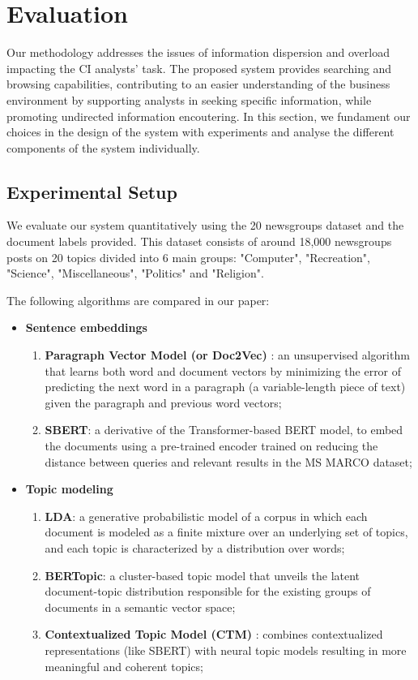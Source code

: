 \documentclass[a4paper]{article}
\begin{document}
\section{Evaluation}
Our methodology addresses the issues of information dispersion and overload impacting the CI analysts' task. The proposed system provides searching and browsing capabilities, contributing to an easier understanding of the business environment by supporting analysts in seeking specific information, while promoting undirected information encoutering. In this section, we fundament our choices in the design of the system with experiments and analyse the different components of the system individually.

\subsection{Experimental Setup}
We evaluate our system quantitatively using the 20 newsgroups \citep{pedregosa2011} dataset and the document labels provided. This dataset consists of around 18,000 newsgroups posts on 20 topics divided into 6 main groups: "Computer", "Recreation", "Science", "Miscellaneous", "Politics" and "Religion".

The following algorithms are compared in our paper:
\begin{itemize}
  \item \textbf{Sentence embeddings}
    \begin{enumerate}
      \item \textbf{Paragraph Vector Model (or Doc2Vec)} \citep{le2014}: an unsupervised algorithm that learns both word and document vectors by minimizing the error of predicting the next word in a paragraph (a variable-length piece of text) given the paragraph and previous word vectors;
      \item \textbf{SBERT}: a derivative of the Transformer-based BERT model, to embed the documents using a pre-trained encoder trained on reducing the distance between queries and relevant results in the MS MARCO dataset; 
    \end{enumerate}
  \item \textbf{Topic modeling}
    \begin{enumerate}
      \item \textbf{LDA}: a generative probabilistic model of a corpus in which each document is modeled as a finite mixture over an underlying set of topics, and each topic is characterized by a distribution over words;
      \item \textbf{BERTopic}: a cluster-based topic model that unveils the latent document-topic distribution responsible for the existing groups of documents in a semantic vector space;
      \item \textbf{Contextualized Topic Model (CTM)} \citep{bianchi2021}: combines contextualized representations (like SBERT) with neural topic models resulting in more meaningful and coherent topics;
    \end{enumerate}
\end{itemize}
\end{document}
